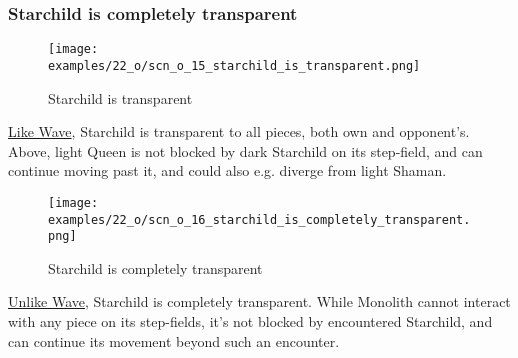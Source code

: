 \clearpage %

\subsubsection*{Starchild is completely transparent}
\label{sec:One/Starchild/Divergence/Starchild is completely transparent}

\vspace*{-1.4\baselineskip}
\noindent
\begin{figure}[!h]
\texttt{[image: examples/22\_o/scn\_o\_15\_starchild\_is\_transparent.png]}
\vspace*{-1.3\baselineskip}
\caption{Starchild is transparent}
\label{fig:scn_o_15_starchild_is_transparent}
\end{figure}

\vspace*{-0.4\baselineskip}
\hyperref[fig:scn_mv_07_wave_is_transparent]{Like Wave}, Starchild is transparent
to all pieces, both own and opponent's. Above, light Queen is not blocked by dark
Starchild on its step-field, and can continue moving past it, and could also e.g.
diverge from light Shaman.

\vspace*{-0.7\baselineskip}
\noindent
\begin{figure}[!h]
\texttt{[image: examples/22\_o/scn\_o\_16\_starchild\_is\_completely\_transparent.png]}
\vspace*{-1.3\baselineskip}
\caption{Starchild is completely transparent}
\label{fig:scn_o_16_starchild_is_completely_transparent}
\end{figure}

\vspace*{-0.4\baselineskip}
\hyperref[fig:scn_d_02_monolith_first_step]{Unlike Wave}, Starchild is completely
transparent. While Monolith cannot interact with any piece on its step-fields, it's
not blocked by encountered Starchild, and can continue its movement beyond such an
encounter.

\clearpage %

